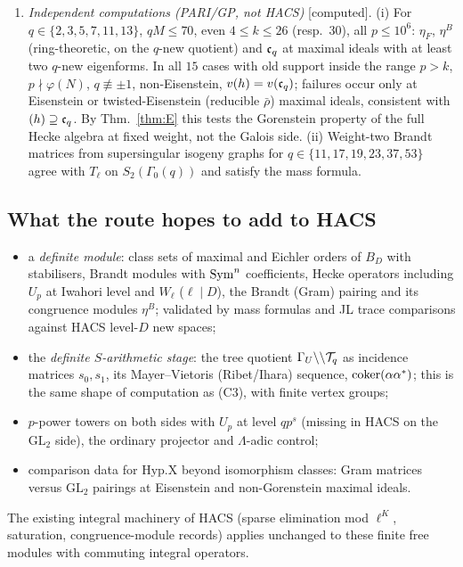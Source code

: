 \documentclass[11pt]{amsart}
\theoremstyle{plain}
\theoremstyle{definition}
\theoremstyle{remark}
\newcommand{\status}[1]{\textup{\textsf{[#1]}}}
\newcommand{\stcomp}{\status{computed}}
\newcommand{\GL}{\mathrm{GL}}\newcommand{\SL}{\mathrm{SL}}\newcommand{\PGL}{\mathrm{PGL}}
\begin{document}
\begin{enumerate}[label=(C\arabic*)]
\begin{itemize}
\item $T_\ell$ ($\ell\ne q$, $\ell\le13$) on all terms; independent cross-checks against HACS: $2447$ comparisons, no mismatch.
\end{itemize}
This is the $\GL_2$ end of the $S$-arithmetic stage: $\coker(\Psi^*\Psi)_\m$ is the Betti incarnation of the old/new congruence module $\cc_q$.
\item \emph{Independent computations (PARI/GP, not HACS)} \stcomp. (i) For $q\in\{2,3,5,7,11,13\}$, $qM\le70$, even $4\le k\le26$ (resp.\ $30$), all $p\le10^6$: $\eta_F$, $\eta^B$ (ring-theoretic, on the $q$-new quotient) and $\cc_q$ at maximal ideals with at least two $q$-new eigenforms. In all $15$ cases with old support inside the range $p>k$, $p\nmid\varphi(N)$, $q\not\equiv\pm1$, non-Eisenstein, $v(h)=v(\mathfrak{c}_q)$; failures occur only at Eisenstein or twisted-Eisenstein (reducible $\bar\rho$) maximal ideals, consistent with $(h)\supseteq\mathfrak{c}_q$. By Thm.~\ref{thm:E} this tests the Gorenstein property of the full Hecke algebra at fixed weight, not the Galois side. (ii) Weight-two Brandt matrices from supersingular isogeny graphs for $q\in\{11,17,19,23,37,53\}$ agree with $T_\ell$ on $S_2(\Gamma_0(q))$ and satisfy the mass formula.
\end{enumerate}

\subsection{What the route hopes to add to HACS}
\begin{itemize}
\item a \emph{definite module}: class sets of maximal and Eichler orders of $B_D$ with stabilisers, Brandt modules with $\mathrm{Sym}^n$ coefficients, Hecke operators including $U_p$ at Iwahori level and $W_\ell$ ($\ell\mid D$), the Brandt (Gram) pairing and its congruence modules $\eta^B$; validated by mass formulas and JL trace comparisons against HACS level-$D$ new spaces;
\item the \emph{definite $S$-arithmetic stage}: the tree quotient $\Gamma_U\backslash\backslash\mathcal{T}_q$ as incidence matrices $s_0,s_1$, its Mayer--Vietoris (Ribet/Ihara) sequence, $\operatorname{coker}(\alpha\alpha^*)$; this is the same shape of computation as (C3), with finite vertex groups;
\item $p$-power towers on both sides with $U_p$ at level $qp^s$ (missing in HACS on the $\GL_2$ side), the ordinary projector and $\Lambda$-adic control;
\item comparison data for $\mathrm{Hyp.X}$ beyond isomorphism classes: Gram matrices versus $\GL_2$ pairings at Eisenstein and non-Gorenstein maximal ideals.
\end{itemize}
The existing integral machinery of HACS (sparse elimination mod $\ell^K$, saturation, congruence-module records) applies unchanged to these finite free modules with commuting integral operators.
\end{document}

